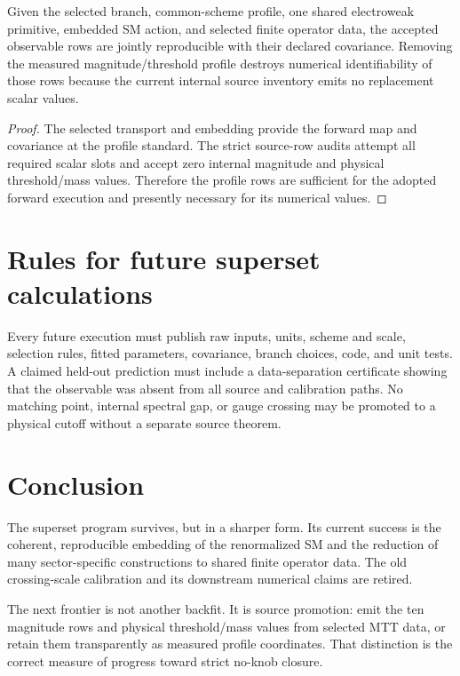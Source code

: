 \documentclass[11pt]{article}
\begin{document}
\begin{theorem}
Given the selected branch, common-scheme profile, one shared electroweak
primitive, embedded SM action, and selected finite operator data, the accepted
observable rows are jointly reproducible with their declared covariance.
Removing the measured magnitude/threshold profile destroys numerical
identifiability of those rows because the current internal source inventory
emits no replacement scalar values.
\end{theorem}

\begin{proof}
The selected transport and embedding provide the forward map and covariance at
the profile standard. The strict source-row audits attempt all required scalar
slots and accept zero internal magnitude and physical threshold/mass values.
Therefore the profile rows are sufficient for the adopted forward execution
and presently necessary for its numerical values.
\end{proof}

\section{Rules for future superset calculations}

Every future execution must publish raw inputs, units, scheme and scale,
selection rules, fitted parameters, covariance, branch choices, code, and unit
tests. A claimed held-out prediction must include a data-separation certificate
showing that the observable was absent from all source and calibration paths.
No matching point, internal spectral gap, or gauge crossing may be promoted to
a physical cutoff without a separate source theorem.

\section{Conclusion}

The superset program survives, but in a sharper form. Its current success is
the coherent, reproducible embedding of the renormalized SM and the reduction
of many sector-specific constructions to shared finite operator data. The old
crossing-scale calibration and its downstream numerical claims are retired.

The next frontier is not another backfit. It is source promotion: emit the ten
magnitude rows and physical threshold/mass values from selected MTT data, or
retain them transparently as measured profile coordinates. That distinction is
the correct measure of progress toward strict no-knob closure.
\end{document}
